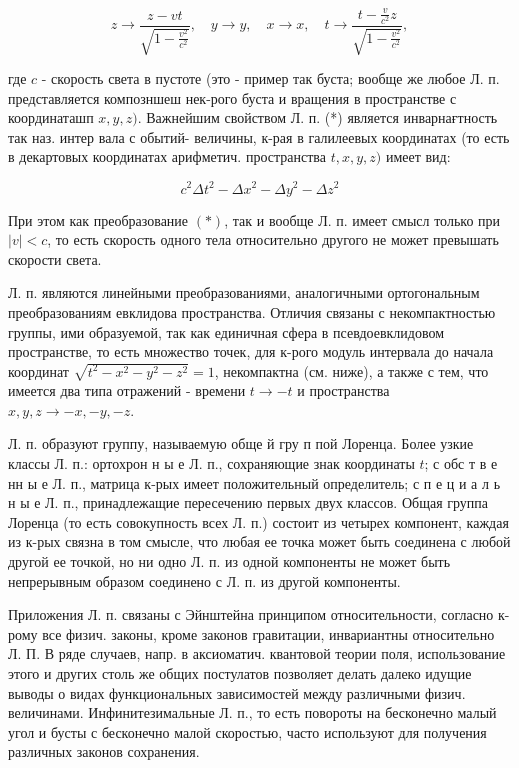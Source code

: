 \documentclass[10pt]{article}
\begin{document}
\[

z \rightarrow \frac{z-v t}{\sqrt{1-\frac{v^{2}}{c^{2}}}}, \quad y \rightarrow y, \quad x \rightarrow x, \quad t \rightarrow \frac{t-\frac{v}{c^{2}} z}{\sqrt{1-\frac{v^{2}}{c^{2}}}},

\]



где $c$ - скорость света в пустоте (это - пример так буста; вообще же любое Л. п. представляется композншеш нек-рого буста и вращения в пространстве с координаташп $x, y, z)$. Важнейшим свойством Л. п. (*) является инварнағтность так наз. интер вала с обытий- величины, к-рая в галилеевых координатах (то есть в декартовых координатах арифметич. пространства $t, x, y, z)$ имеет вид:



\[

c^{2} \Delta t^{2}-\Delta x^{2}-\Delta y^{2}-\Delta z^{2}

\]



При этом как преобразование $(*)$, так и вообще Л. п. имеет смысл только при $|v|<c$, то есть скорость одного тела относительно другого не может превышать скорости света.



Л. п. являются линейными преобразованиями, аналогичными ортогональным преобразованиям евклидова пространства. Отличия связаны с некомпактностью группы, ими образуемой, так как единичная сфера в псевдоевклидовом пространстве, то есть множество точек, для к-рого модуль интервала до начала координат $\sqrt{t^{2}-x^{2}-y^{2}-z^{2}}=1$, некомпактна (см. ниже), а также с тем, что имеется два типа отражений - времени $t \rightarrow-t$ и пространства $x, y, z \rightarrow-x,-y,-z$.



Л. п. образуют группу, называемую обще й гру п пой Лоренца. Более узкие классы Л. п.: ортохрон н ы е Л. п., сохраняющие знак координаты $t$; с обс т в е нн ы е Л. п., матрица к-рых имеет положительный определитель; с п е ц и а л ь н ы е Л. п., принадлежащие пересечению первых двух классов. Общая группа Лоренца (то есть совокупность всех Л. п.) состоит из четырех компонент, каждая из к-рых связна в том смысле, что любая ее точка может быть соединена с любой другой ее точкой, но ни одно Л. п. из одной компоненты не может быть непрерывным образом соединено с Л. п. из другой компоненты.



Приложения Л. п. связаны с Эйнштейна принципом относительности, согласно к-рому все физич. законы, кроме законов гравитации, инвариантны относительно Л. П. В ряде случаев, напр. в аксиоматич. квантовой теории поля, использование этого и других столь же общих постулатов позволяет делать далеко идущие выводы о видах функциональных зависимостей между различными физич. величинами. Инфинитезимальные Л. п., то есть повороты на бесконечно малый угол и бусты с бесконечно малой скоростью, часто используют для получения различных законов сохранения.
\end{document}
